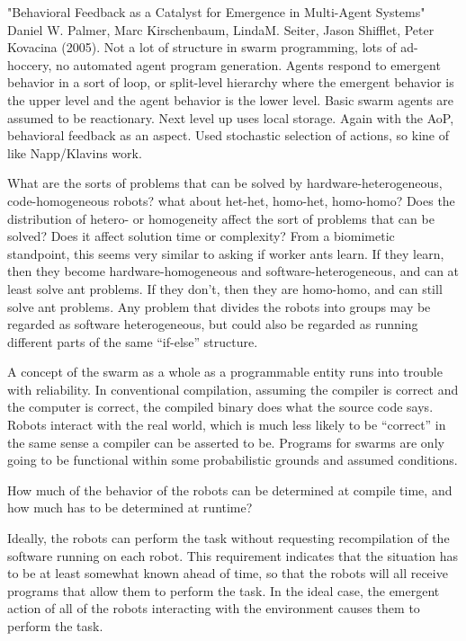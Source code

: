 \documentclass[]{article}
\begin{document}
"Behavioral Feedback as a Catalyst for Emergence in Multi-Agent Systems" \cite{palmer2005behavioral} Daniel W. Palmer, Marc Kirschenbaum, LindaM. Seiter, Jason Shifflet, Peter Kovacina (2005). Not a lot of structure in swarm programming, lots of ad-hoccery, no automated agent program generation. Agents respond to emergent behavior in a sort of loop, or split-level hierarchy where the emergent behavior is the upper level and the agent behavior is the lower level. Basic swarm agents are assumed to be reactionary. Next level up uses local storage. Again with the AoP, behavioral feedback as an aspect. Used stochastic selection of actions, so kine of like Napp/Klavins work. 

What are the sorts of problems that can be solved by hardware-heterogeneous, code-homogeneous robots? what about het-het, homo-het, homo-homo? Does the distribution of hetero- or homogeneity affect the sort of problems that can be solved? Does it affect solution time or complexity? From a biomimetic standpoint, this seems very similar to asking if worker ants learn. If they learn, then they become hardware-homogeneous and software-heterogeneous, and can at least solve ant problems. If they don't, then they are homo-homo, and can still solve ant problems. Any problem that divides the robots into groups may be regarded as software heterogeneous, but could also be regarded as running different parts of the same ``if-else'' structure. 

A concept of the swarm as a whole as a programmable entity runs into trouble with reliability. In conventional compilation, assuming the compiler is correct and the computer is correct, the compiled binary does what the source code says. Robots interact with the real world, which is much less likely to be ``correct'' in the same sense a compiler can be asserted to be. Programs for swarms are only going to be functional within some probabilistic grounds and assumed conditions. 

How much of the behavior of the robots can be determined at compile time, and how much has to be determined at runtime?

Ideally, the robots can perform the task without requesting recompilation of the software running on each robot. 
This requirement indicates that the situation has to be at least somewhat known ahead of time, so that the robots will all receive programs that allow them to perform the task.
In the ideal case, the emergent action of all of the robots interacting with the environment causes them to perform the task. 
\end{document}
